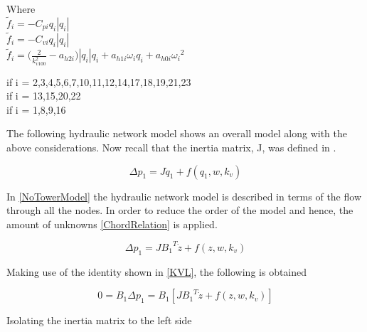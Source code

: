 \begin{minipage}[t]{0.20\textwidth}
Where\\
\hspace*{2mm} $\tilde{f}_i = -C_{pi} q_i |q_i|$  \\
\hspace*{2mm} $\tilde{f}_i = -C_{vi} q_i |q_i|$  \\
\hspace*{2mm} $\tilde{f}_i = \Big(\frac{2}{k_{v100}^2} - a_{h2i}\Big)|q_i| q_i  + a_{h1i} \omega_{i} q_i + a_{h0i}{\omega_i}^2$  
\end{minipage}
\begin{minipage}[t]{0.68\textwidth}
\vspace*{2mm}
\hspace*{25mm} if i = 2,3,4,5,6,7,10,11,12,14,17,18,19,21,23\\
\hspace*{25mm} if i = 13,15,20,22						   \\
\hspace*{65mm} if i = 1,8,9,16						   
\end{minipage}


The following hydraulic network model shows an overall model along with the above considerations. 
Now recall that the inertia matrix, J, was defined in .

\begin{equation}
  \Delta p_1 =  J \dot{q}_1 + f(q_1, w, k_v)
  \label{NoTowerModel}
\end{equation}

In \eqref{NoTowerModel} the hydraulic network model is described in terms of the 
flow through all the nodes. In order to reduce the order of the model and hence, 
the amount of unknowns \eqref{ChordRelation} is applied. 

\begin{equation}
  \Delta p_1 =  J {B_1}^T \dot{z} + f(z, w, k_v)
  \label{ChordsModel}
\end{equation}

Making use of the identity shown in \eqref{KVL}, the following is obtained

\begin{equation}
  0 = B_1 \Delta p_1 = B_1 [ J {B_1}^T \dot{z} + f(z, w, k_v)] 
 \end{equation}

Isolating the inertia matrix to the left side

